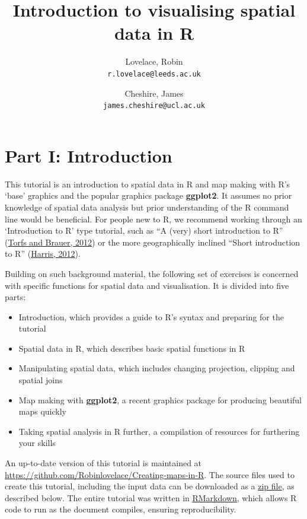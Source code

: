 \documentclass[]{article}
\author{}
\author{Lovelace, Robin\\
\texttt{r.lovelace@leeds.ac.uk}
\and
Cheshire, James\\
\texttt{james.cheshire@ucl.ac.uk}
}
\title{Introduction to visualising spatial data in R}
\begin{document}
\maketitle

\tableofcontents

\section{Part I: Introduction}\label{part-i-introduction}

This tutorial is an introduction to spatial data in R and map making
with R's `base' graphics and the popular graphics package
\textbf{ggplot2}. It assumes no prior knowledge of spatial data analysis
but prior understanding of the R command line would be beneficial. For
people new to R, we recommend working through an `Introduction to R'
type tutorial, such as ``A (very) short introduction to R''
(\href{http://cran.r-project.org/doc/contrib/Torfs+Brauer-Short-R-Intro.pdf}{Torfs
and Brauer, 2012}) or the more geographically inclined ``Short
introduction to R''
(\href{http://www.social-statistics.org/wp-content/uploads/2012/12/intro_to_R1.pdf}{Harris,
2012}).

Building on such background material, the following set of exercises is
concerned with specific functions for spatial data and visualisation. It
is divided into five parts:

\begin{itemize}
\itemsep1pt\parskip0pt
\item
  Introduction, which provides a guide to R's syntax and preparing for
  the tutorial
\item
  Spatial data in R, which describes basic spatial functions in R
\item
  Manipulating spatial data, which includes changing projection,
  clipping and spatial joins
\item
  Map making with \textbf{ggplot2}, a recent graphics package for
  producing beautiful maps quickly
\item
  Taking spatial analysis in R further, a compilation of resources for
  furthering your skills
\end{itemize}

An up-to-date version of this tutorial is maintained at
\href{https://github.com/Robinlovelace/Creating-maps-in-R/blob/master/intro-spatial-rl.pdf}{https://github.com/Robinlovelace/Creating-maps-in-R}.
The source files used to create this tutorial, including the input data
can be downloaded as a
\href{https://github.com/Robinlovelace/Creating-maps-in-R/archive/master.zip}{zip
file}, as described below. The entire tutorial was written in
\href{http://rmarkdown.rstudio.com/}{RMarkdown}, which allows R code to
run as the document compiles, ensuring reproducibility.
\end{document}
